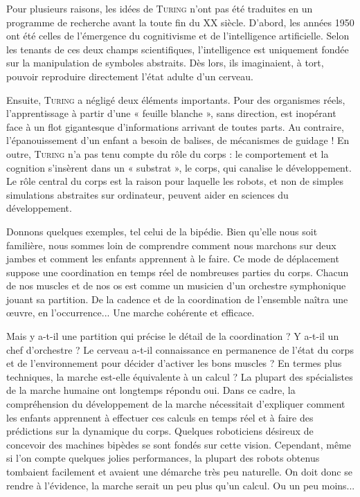 Pour plusieurs raisons, les idées de \textsc{Turing} n’ont pas été traduites en un programme de recherche avant la toute fin du XX siècle. D’abord, les années 1950 ont été celles de l’émergence du cognitivisme et de l’intelligence artificielle. Selon les tenants de ces deux champs scientifiques, l’intelligence est uniquement fondée sur la manipulation de symboles abstraits. Dès lors, ils imaginaient, à tort, pouvoir reproduire directement l’état adulte d’un cerveau.

Ensuite, \textsc{Turing} a négligé deux éléments importants. Pour des organismes réels, l’apprentissage à partir d’une « feuille blanche », sans direction, est inopérant face à un flot gigantesque d’informations arrivant de toutes parts. Au contraire, l’épanouissement d’un enfant a besoin de balises, de mécanismes de guidage ! En outre, \textsc{Turing} n’a pas tenu compte du rôle du corps : le comportement et la cognition s’insèrent dans un « substrat », le corps, qui canalise le développement. Le rôle central du corps est la raison pour laquelle les robots, et non de simples simulations abstraites sur ordinateur, peuvent aider en sciences du développement.


Donnons quelques exemples, tel celui de la bipédie. Bien qu’elle nous soit familière, nous sommes loin de comprendre comment nous marchons sur deux jambes et comment les enfants apprennent à le faire. Ce mode de déplacement suppose une coordination en temps réel de nombreuses parties du corps. Chacun de nos muscles et de nos os est comme un musicien d’un orchestre symphonique jouant sa partition. De la cadence et de la coordination de l’ensemble naîtra une œuvre, en l’occurrence... Une marche cohérente et efficace.

Mais y a-t-il une partition qui précise le détail de la coordination ? Y a-t-il un chef d’orchestre ? Le cerveau a-t-il connaissance en permanence de l’état du corps et de l’environnement pour décider d’activer les bons muscles ? En termes plus techniques, la marche est-elle équivalente à un calcul ? La plupart des spécialistes de la marche humaine ont longtemps répondu oui. Dans ce cadre, la compréhension du développement de la marche nécessitait d’expliquer comment les enfants apprennent à effectuer ces calculs en temps réel et à faire des prédictions sur la dynamique du corps. Quelques roboticiens désireux de concevoir des machines bipèdes se sont fondés sur cette vision. Cependant, même si l’on compte quelques jolies performances, la plupart des robots obtenus tombaient facilement et avaient une démarche très peu naturelle. On doit donc se rendre à l’évidence, la marche serait un peu plus qu’un calcul. Ou un peu moins...

